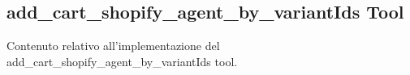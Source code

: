 \subsection{add\_cart\_shopify\_agent\_by\_variantIds Tool}

Contenuto relativo all'implementazione del add\_cart\_shopify\_agent\_by\_variantIds tool.
